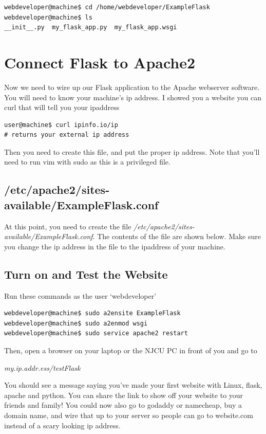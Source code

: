 \documentclass[10pt]{article}
\begin{document}
\begin{lstlisting}[style=term]
webdeveloper@machine$ cd /home/webdeveloper/ExampleFlask
webdeveloper@machine$ ls
__init__.py  my_flask_app.py  my_flask_app.wsgi
\end{lstlisting}

\section{Connect Flask to Apache2}
Now we need to wire up our Flask application to the Apache webserver software. You will need to know your machine's ip address. I showed you a website you can curl that will tell you your ipaddress

\begin{lstlisting}[style=term]
user@machine$ curl ipinfo.io/ip
# returns your external ip address
\end{lstlisting}

Then you need to create this file, and put the proper ip address. Note that you'll need to run vim with sudo as this is a privileged file.

\subsection{/etc/apache2/sites-available/ExampleFlask.conf}
At this point, you need to create the file
\textit{/etc/apache2/sites-available/ExampleFlask.conf}. The contents of the
file are shown below. Make sure you change the ip address in the file to the
ipaddress of your machine. 



\subsection{Turn on and Test the Website}
Run these commands as the user `webdeveloper'
\begin{lstlisting}[style=term]
webdeveloper@machine$ sudo a2ensite ExampleFlask
webdeveloper@machine$ sudo a2enmod wsgi
webdeveloper@machine$ sudo service apache2 restart
\end{lstlisting}

Then, open a browser on your laptop or the NJCU PC in front of you and go to 

\begin{center}
\textit{my.ip.addr.ess/testFlask}
\end{center}

You should see a message saying you've made your first website with Linux, flask, apache and python. You can share the link to show off your website to your friends and family! You could now also go to godaddy or namecheap, buy a domain name, and wire that up to your server so people can go to website.com instead of a scary looking ip address.
\end{document}
